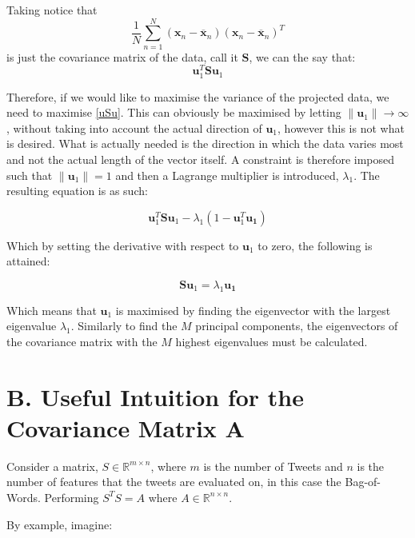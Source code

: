 \documentclass[11pt,a4paper]{article}
\begin{document}
Taking notice that 
\begin{equation*}
\frac{1}{N} \sum_{n = 1}^N \left(\mathbf{x}_n - \mathbf{\overline{x}}_n\right)\left(\mathbf{x}_n - \mathbf{\overline{x}}_n\right)^T 
\end{equation*} 
is just the covariance matrix of the data, call it $\mathbf{S}$, we can the say that:
\begin{equation}
\mathbf{u}_1^T \mathbf{S} \mathbf{u}_1
\label{uSu}
\end{equation} 

Therefore, if we would like to maximise the variance of the projected data, we need to maximise \eqref{uSu}. This can obviously be maximised by letting $\|\mathbf{u}_1\| \to \infty$, without taking into account the actual direction of $\mathbf{u}_1$, however this is not what is desired. What is actually needed is the direction in which the data varies most and not the actual length of the vector itself. A constraint is therefore imposed such that $\|\mathbf{u}_1\| = 1$ and then a Lagrange multiplier is introduced, $\lambda_1$. The resulting equation is as such:


\begin{equation*}
\mathbf{u}_1^T \mathbf{S} \mathbf{u}_1 - \lambda_1 (1 - \mathbf{u}_1^T \mathbf{u_1})
\label{lagrange_uSu}
\end{equation*} 

Which by setting the derivative with respect to $\mathbf{u}_1$ to zero, the following is attained:


\begin{equation*}
\mathbf{S} \mathbf{u}_1 = \lambda_1  \mathbf{u_1}
\label{eig_uSu}
\end{equation*} 

Which means that $\mathbf{u}_1$ is maximised by finding the eigenvector with the largest eigenvalue $\lambda_1$. Similarly to find the $M$ principal components, the eigenvectors of the covariance matrix with the $M$ highest eigenvalues must be calculated.
\clearpage
\section*{B. Useful Intuition for the Covariance Matrix $\mathbf{A}$}
Consider a matrix, $S\in \mathbb{R}^{m\times n}$, where $m$ is the number of Tweets and $n$ is the number of features that the tweets are evaluated on, in this case the Bag-of-Words. Performing $S^TS = A$ where $A \in \mathbb{R}^{n\times n}$. 

By example, imagine:
\end{document}
